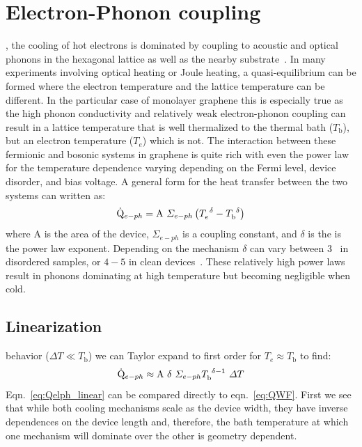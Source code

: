 \section{Electron-Phonon coupling}
\label{section:elph}
, the cooling of hot electrons is dominated by coupling to acoustic and optical phonons in the hexagonal lattice as well as the nearby substrate~\cite{viljas_electron-phonon_2010,bistritzer_electronic_2009}. In many experiments involving optical heating or Joule heating, a quasi-equilibrium can be formed where the electron temperature and the lattice temperature can be different. In the particular case of monolayer graphene this is especially true as the high phonon conductivity and relatively weak electron-phonon coupling can result in a lattice temperature that is well thermalized to the thermal bath ($T_\mathrm{b}$), but an electron temperature ($T_e$) which is not. The interaction between these fermionic and bosonic systems in graphene is quite rich with even the power law for the temperature dependence varying depending on the Fermi level, device disorder, and bias voltage. A general form for the heat transfer between the two systems can written as:
\begin{equation}\label{eq:Qelph}
\dot{\mathrm{Q}}_{e-ph}=\mathrm{A}~\Sigma_{e-ph}\left( T_e^{~\delta} - T_\mathrm{b}^{~\delta} \right)
\end{equation}
where $\mathrm{A}$ is the area of the device, $\Sigma_{e-ph}$ is a coupling constant, and $\delta$ is the is the power law exponent. Depending on the mechanism $\delta$ can vary between $3$~\cite{song_disorder-assisted_2012, chen_electron-phonon_2012} in disordered samples,  or $4-5$ in clean devices~\cite{viljas_electron-phonon_2010, bistritzer_electronic_2009}. These relatively high power laws result in phonons dominating at high temperature but becoming negligible when cold.
\subsection{Linearization}
 behavior ($\Delta T \ll T_\mathrm{b}$) we can Taylor expand to first order for $T_e\approx T_\mathrm{b}$ to find:
\begin{equation}\label{eq:Qelph_linear}
\dot{\mathrm{Q}}_{e-ph} \approx \mathrm{A}~\delta~\Sigma_{e-ph}T_\mathrm{b}^{~\delta-1}~\Delta T
\end{equation}
Eqn.~\ref{eq:Qelph_linear} can be compared directly to eqn.~\ref{eq:QWF}. First we see that while both cooling mechanisms scale as the device width, they have inverse dependences on the device length and, therefore, the bath temperature at which one mechanism will dominate over the other is geometry dependent.


